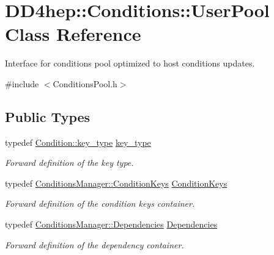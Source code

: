 \hypertarget{class_d_d4hep_1_1_conditions_1_1_user_pool}{}\section{D\+D4hep\+:\+:Conditions\+:\+:User\+Pool Class Reference}
\label{class_d_d4hep_1_1_conditions_1_1_user_pool}


Interface for conditions pool optimized to host conditions updates.  




{\ttfamily \#include $<$Conditions\+Pool.\+h$>$}

\subsection*{Public Types}
\begin{DoxyCompactItemize}
\item 
typedef \hyperlink{class_d_d4hep_1_1_conditions_1_1_condition_a7528efa762e8cc072ef80ea67c3531f9}{Condition\+::key\+\_\+type} \hyperlink{class_d_d4hep_1_1_conditions_1_1_user_pool_aa256cf1e22de1b9f2a84d39309b8bfa9}{key\+\_\+type}
\begin{DoxyCompactList}\small\item\em Forward definition of the key type. \end{DoxyCompactList}\item 
typedef \hyperlink{class_d_d4hep_1_1_conditions_1_1_conditions_manager_a8dd76f9acef2c8d3b7970e266fe7eff6}{Conditions\+Manager\+::\+Condition\+Keys} \hyperlink{class_d_d4hep_1_1_conditions_1_1_user_pool_a6282d01af77401a4c20f08391d18cc95}{Condition\+Keys}
\begin{DoxyCompactList}\small\item\em Forward definition of the condition keys container. \end{DoxyCompactList}\item 
typedef \hyperlink{class_d_d4hep_1_1_conditions_1_1_conditions_manager_aab778cfbe096ae8ad20a0bdbb047ad32}{Conditions\+Manager\+::\+Dependencies} \hyperlink{class_d_d4hep_1_1_conditions_1_1_user_pool_a0da9a8bee4190e4deebf83102902118d}{Dependencies}
\begin{DoxyCompactList}\small\item\em Forward definition of the dependency container. \end{DoxyCompactList}\end{DoxyCompactItemize}
